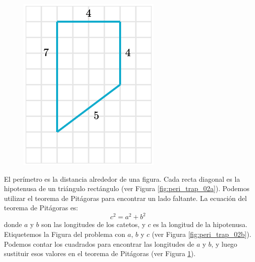 \begin{solutionbox}{16cm}
\begin{minipage}{0.4\textwidth}
\begin{multicols}{2}
\begin{figure}[H]
                \caption{}
                \label{fig:peri_trap_02c}
            \end{figure}
            \begin{figure}[H]
                \centering
                \includegraphics[width=0.9\linewidth]{../images/peri_trap_02d.png}
                \caption{}
                \label{fig:peri_trap_02d}
            \end{figure}
        \end{multicols}
    \end{minipage}\hfill
    \begin{minipage}{0.55\textwidth}
        El perímetro es la distancia alrededor de una figura.
        Cada recta diagonal es la hipotenusa de un triángulo rectángulo (ver Figura \ref{fig:peri_trap_02a}).
        Podemos utilizar el teorema de Pitágoras para encontrar un lado faltante.
        La ecuación del teorema de Pitágoras es:
        \[c^2=a^2+b^2\]
        donde $a$ y $b$ son las longitudes de los catetos, y $c$ es la longitud de la hipotenusa.
        Etiquetemos la Figura del problema con $a$, $b$ y $c$ (ver Figura \ref{fig:peri_trap_02b}).
        Podemos contar los cuadrados para encontrar las longitudes de $a$ y $b$, y luego sustituir esos valores en el teorema de Pitágoras (ver Figura \ref{fig:peri_trap_02c}).

\end{minipage}
\end{solutionbox}
